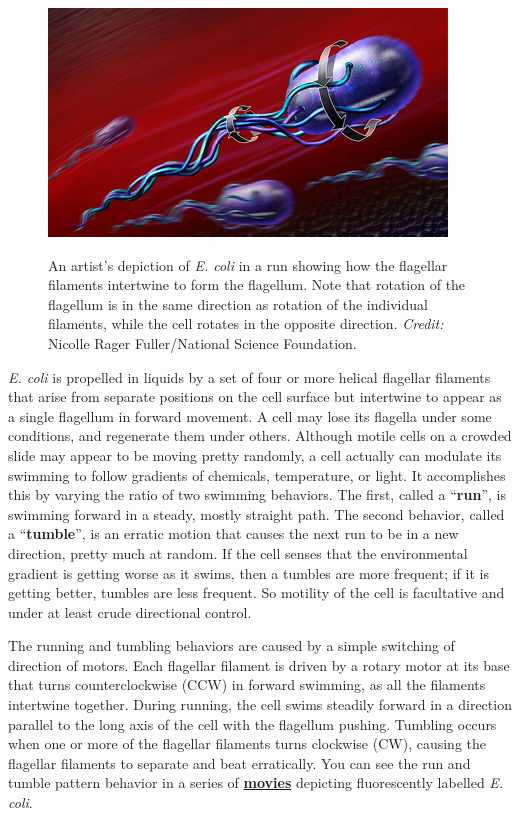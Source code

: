 \documentclass{../lab}
\begin{document}
\begin{figure}[h]
    \centering
    \href{http://experimentationlab.berkeley.edu/sites/default/files/images/400px-Ecoli800.jpg}{\includegraphics[width=0.5\linewidth]{images/400px-Ecoli800.jpg}}
    \caption{An artist's depiction of \emph{E. coli} in a run showing how the flagellar filaments intertwine to form the flagellum. Note that rotation of the flagellum is in the same direction as rotation of the individual filaments, while the cell rotates in the opposite direction. \emph{Credit:} Nicolle Rager Fuller/National Science Foundation.}
    \label{fig:400px-Ecoli800}
\end{figure}

\emph{E. coli} is propelled in liquids by a set of four or more helical flagellar filaments that arise from separate positions on the cell surface but intertwine to appear as a single flagellum in forward movement. A cell may lose its flagella under some conditions, and regenerate them under others. Although motile cells on a crowded slide may appear to be moving pretty randomly, a cell actually can modulate its swimming to follow gradients of chemicals, temperature, or light. It accomplishes this by varying the ratio of two swimming behaviors. The first, called a ``\textbf{run}'', is swimming forward in a steady, mostly straight path. The second behavior, called a ``\textbf{tumble}'', is an erratic motion that causes the next run to be in a new direction, pretty much at random. If the cell senses that the environmental gradient is getting worse as it swims, then a tumbles are more frequent; if it is getting better, tumbles are less frequent. So motility of the cell is facultative and under at least crude directional control.

\newpage

The running and tumbling behaviors are caused by a simple switching of direction of motors. Each flagellar filament is driven by a rotary motor at its base that turns counterclockwise (CCW) in forward swimming, as all the filaments intertwine together. During running, the cell swims steadily forward in a direction parallel to the long axis of the cell with the flagellum pushing. Tumbling occurs when one or more of the flagellar filaments turns clockwise (CW), causing the flagellar filaments to separate and beat erratically. You can see the run and tumble pattern behavior in a series of \href{http://www.rowland.harvard.edu/labs/bacteria/movies/ecoli.php}{\textbf{movies}} depicting fluorescently labelled \emph{E. coli}.
\end{document}

